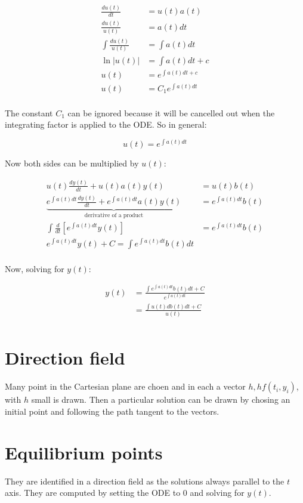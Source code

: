 \begin{align*}
	\frac{du(t)}{dt} &= u(t)a(t)\\
	\frac{du(t)}{u(t)} &= a(t)dt\\
	\int\frac{du(t)}{u(t)} &= \int a(t)dt\\
	\ln|u(t)| &= \int a(t)dt + c\\
	u(t) &= e^{\int a(t)dt + c}\\
	u(t) &= C_1e^{\int a(t)dt}\\
\end{align*}

The constant $C_1$ can be ignored because it will be cancelled out when the integrating factor is applied to the ODE.
So in general:

$$u(t) = e^{\int a(t)dt}$$

Now both sides can be multiplied by $u(t)$:

\begin{align*}
	u(t)\frac{dy(t)}{dt} + u(t)a(t)y(t) &= u(t)b(t)\\
	\underbrace{e^{\int a(t)dt}\frac{dy(t)}{dt} + e^{\int a(t)dt}a(t)y(t)}_{\text{derivative of a product}} &= e^{\int a(t)dt}b(t)\\
	\int\frac{d}{dt}\left[e^{\int a(t)dt}y(t)\right] &= e^{\int a(t)dt}b(t)\\
	e^{\int a(t) dt}y(t) + C = \int e^{\int a(t)dt}b(t)dt\\
\end{align*}

Now, solving for $y(t)$:

\begin{align*}
	y(t) &= \frac{\int e^{\int a(t)dt}b(t)dt + C}{e^{\int a(t)dt}}\\
	     &= \frac{\int u(t)db(t)dt + C}{u(t)}\\
\end{align*}

\section{Direction field}
Many point in the Cartesian plane are choen and in each a vector $h, hf(t_i, y_i)$, with $h$ small is drawn.
Then a particular solution can be drawn by chosing an initial point and following the path tangent to the vectors.

\section{Equilibrium points}
They are identified in a direction field as the solutions always parallel to the $t$ axis.
They are computed by setting the ODE to $0$ and solving for $y(t)$.

